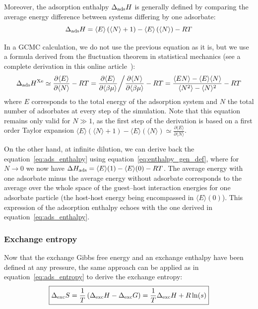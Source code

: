 \documentclass[main.tex]{subfiles}
\begin{document}
Moreover, the adsorption enthalpy $\Delta_{\text{ads}}H$ is generally defined by comparing the average energy difference between systems differing by one adsorbate:
\begin{equation}\label{eq:enthalpy_gen_def}
  \Delta_{\text{ads}}H = \langle E \rangle\left(\langle N \rangle+1\right)-\langle E \rangle\left(\langle N \rangle\right) - RT
\end{equation}

In a GCMC calculation, we do not use the previous equation as it is, but we use a formula derived from the fluctuation theorem in statistical mechanics (see a complete derivation in this online article~\autocite{github_simon_gcmc}):
\begin{equation}\label{eq:ads_heat_gcmc}
  \Delta_{\text{ads}}H^{\text{Xe}} \simeq \frac{\partial \langle E \rangle}{\partial \langle N \rangle} - RT = \frac{\partial\langle E \rangle}{\partial\langle \beta\mu \rangle} \bigg/ \frac{\partial \langle N \rangle}{\partial \langle \beta\mu \rangle} - RT = \dfrac{\langle EN \rangle - \langle E \rangle\langle N \rangle}{\langle N^2 \rangle - \langle N \rangle^2} - RT
\end{equation}
where $E$ corresponds to the total energy of the adsorption system and $N$ the total number of adsorbates at every step of the simulation. Note that this equation remains only valid for $N\gg1$, as the first step of the derivation is based on a first order Taylor expansion $\langle E \rangle\left(\langle N \rangle+1\right)-\langle E \rangle\left(\langle N \rangle\right) \simeq \frac{\partial \langle E \rangle}{\partial \langle N \rangle}$. 


On the other hand, at infinite dilution, we can derive back the equation~\ref{eq:ads_enthalpy} using equation~\ref{eq:enthalpy_gen_def}, where for $N\rightarrow0$ we now have $\Delta H_{\text{ads}} = \langle E \rangle(1)-\langle E \rangle(0) - RT$. The average energy with one adsorbate minus the average energy without adsorbate corresponds to the average over the whole space of the guest--host interaction energies for one adsorbate particle (the host-host energy being encompassed in $\langle E \rangle(0)$). This expression of the adsorption enthalpy echoes with the one derived in equation~\ref{eq:ads_enthalpy}.

\subsubsection{Exchange entropy}

Now that the exchange Gibbs free energy and an exchange enthalpy have been defined at any pressure, the same approach can be applied as in equation~\ref{eq:ads_entropy} to derive the exchange entropy:
\begin{equation}\label{eq:exc_entropy}
  \boxed{
  \Delta_{\text{exc}}S = \dfrac{1}{T}\left(\Delta_{\text{exc}}H - \Delta_{\text{exc}}G\right)= \dfrac{1}{T}\Delta_{\text{exc}}H + R\ln(s)
  }
\end{equation}
\end{document}
